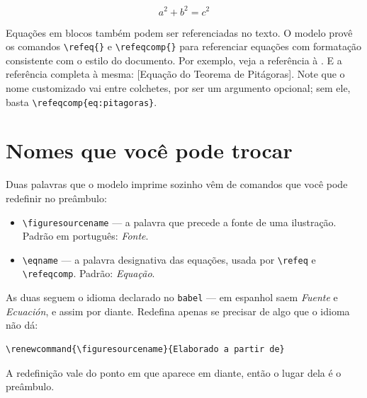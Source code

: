 \begin{equation}
    a^2 + b^2 = c^2
    \label{eq:pitagoras}
\end{equation}

Equações em blocos também podem ser referenciadas no texto. O modelo provê os comandos
\verb|\refeq{}| e \verb|\refeqcomp{}| para referenciar equações com formatação consistente com o
estilo do documento. Por exemplo, veja a referência à . E a referência
completa à mesma: [Equação do Teorema de Pitágoras]. Note que o nome
customizado vai entre colchetes, por ser um argumento opcional; sem ele, basta
\verb|\refeqcomp{eq:pitagoras}|.

\section{Nomes que você pode trocar}\label{sec:nomes-personalizaveis}

Duas palavras que o modelo imprime sozinho vêm de comandos que você pode redefinir no preâmbulo:

\begin{itemize}
    \item \texttt{\textbackslash figuresourcename} --- a palavra que precede a fonte de uma
          ilustração. Padrão em português: \textit{Fonte}.
    \item \texttt{\textbackslash eqname} --- a palavra designativa das equações, usada por
          \texttt{\textbackslash refeq} e \texttt{\textbackslash refeqcomp}. Padrão:
          \textit{Equação}.
\end{itemize}

As duas seguem o idioma declarado no \texttt{babel} --- em espanhol saem \textit{Fuente} e
\textit{Ecuación}, e assim por diante. Redefina apenas se precisar de algo que o idioma não dá:

\begin{Verbatim}[fontsize=\small]
\renewcommand{\figuresourcename}{Elaborado a partir de}
\end{Verbatim}

A redefinição vale do ponto em que aparece em diante, então o lugar dela é o preâmbulo.
